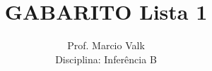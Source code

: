 \documentclass[10pt,brazil,addpoints]{exam}
\begin{document}
\title{GABARITO Lista 1}


\author{
  Prof. Marcio Valk \\
  Disciplina: Inferência B\\
  \date{}
}


\maketitle
\end{document}

